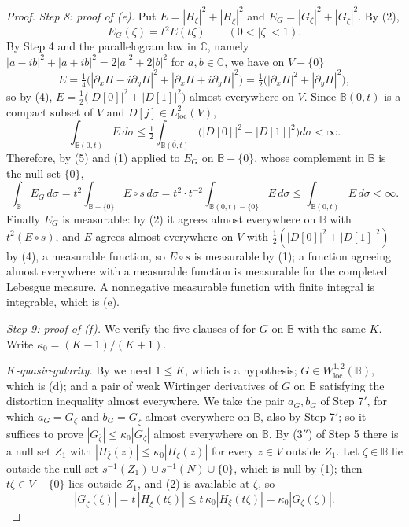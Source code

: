 \begin{proof}
\emph{Step 8: proof of (e).}  Put
$E=|H_\xi|^2+|H_{\bar\xi}|^2$ and $E_G=|G_\zeta|^2+|G_{\bar\zeta}|^2$.  By (2),
\begin{equation}\tag{5}
  E_G(\zeta)=t^2E(t\zeta)\qquad(0<|\zeta|<1).
\end{equation}
By Step 4 and the parallelogram law in $\mathbb{C}$, namely
$|a-ib|^2+|a+ib|^2=2|a|^2+2|b|^2$ for $a,b\in\mathbb{C}$, we have on $V-\{0\}$
\[
  E=\tfrac14\bigl(|\partial_xH-i\partial_yH|^2+|\partial_xH+i\partial_yH|^2\bigr)
  =\tfrac12\bigl(|\partial_xH|^2+|\partial_yH|^2\bigr),
\]
so by (4),
$E=\tfrac12\bigl(|D[0]|^2+|D[1]|^2\bigr)$ almost everywhere on $V$.  Since
$\overline{\mathbb{B}(0,t)}$ is a compact subset of $V$ and
$D[j]\in L^2_{\mathrm{loc}}(V)$,
\[
  \int_{\mathbb{B}(0,t)}E\,d\sigma
  \le\tfrac12\int_{\overline{\mathbb{B}(0,t)}}
    \bigl(|D[0]|^2+|D[1]|^2\bigr)d\sigma<\infty .
\]
Therefore, by (5) and (1) applied to $E_G$ on $\mathbb{B}-\{0\}$, whose
complement in $\mathbb{B}$ is the null set $\{0\}$,
\[
  \int_{\mathbb{B}}E_G\,d\sigma
  =t^2\int_{\mathbb{B}-\{0\}}E\circ s\,d\sigma
  =t^2\cdot t^{-2}\int_{\mathbb{B}(0,t)-\{0\}}E\,d\sigma
  \le\int_{\mathbb{B}(0,t)}E\,d\sigma<\infty .
\]
Finally $E_G$ is measurable: by (2) it agrees almost everywhere on
$\mathbb{B}$ with $t^2(E\circ s)$, and $E$ agrees almost everywhere on $V$ with
$\tfrac12(|D[0]|^2+|D[1]|^2)$ by (4), a measurable function, so $E\circ s$ is
measurable by (1); a function agreeing almost everywhere with a measurable
function is measurable for the completed Lebesgue measure.  A nonnegative measurable
function with finite integral is integrable, which is (e).

\emph{Step 9: proof of (f).}  We verify the five clauses of
 for $G$ on $\mathbb{B}$ with the same $K$.  Write
$\kappa_0=(K-1)/(K+1)$.

\emph{$K$-quasiregularity.}  By  we need $1\le K$,
which is a hypothesis; $G\in W^{1,2}_{\mathrm{loc}}(\mathbb{B})$, which is (d);
and a pair of weak Wirtinger derivatives of $G$ on $\mathbb{B}$ satisfying the
distortion inequality almost everywhere.  We take the pair $a_G,b_G$ of
Step 7$'$, for which $a_G=G_\zeta$ and $b_G=G_{\bar\zeta}$ almost everywhere on
$\mathbb{B}$, also by Step 7$'$; so it suffices to prove
$|G_{\bar\zeta}|\le\kappa_0|G_\zeta|$ almost everywhere on $\mathbb{B}$.  By
(3$''$) of Step 5 there is a null set $Z_1$ with
$|H_{\bar\xi}(z)|\le\kappa_0|H_\xi(z)|$ for every $z\in V$ outside $Z_1$.  Let
$\zeta\in\mathbb{B}$ lie outside the null set
$s^{-1}(Z_1)\cup s^{-1}(N)\cup\{0\}$, which is null by (1); then
$t\zeta\in V-\{0\}$ lies outside $Z_1$, and (2) is available at $\zeta$, so
\[
  |G_{\bar\zeta}(\zeta)|=t\,|H_{\bar\xi}(t\zeta)|
  \le t\,\kappa_0|H_\xi(t\zeta)|=\kappa_0|G_\zeta(\zeta)| .
\]


\end{proof}
